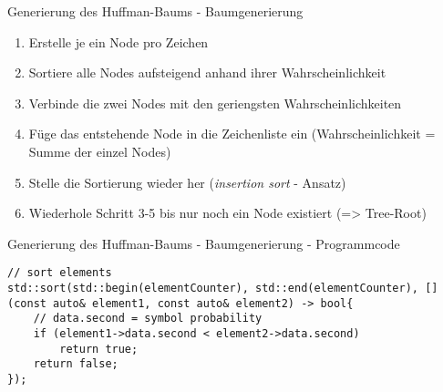 \documentclass{beamer}
\begin{document}
  
  \begin{frame}{Generierung des Huffman-Baums - \newline Baumgenerierung}
  	\begin{enumerate}
  		\item Erstelle je ein Node pro Zeichen
  		\item Sortiere alle Nodes aufsteigend anhand ihrer Wahrscheinlichkeit
  		\item Verbinde die zwei Nodes mit den geriengsten Wahrscheinlichkeiten
  		\item Füge das entstehende Node in die Zeichenliste ein \newline (Wahrscheinlichkeit = Summe der einzel Nodes)
  		\item Stelle die Sortierung wieder her \newline (\textit{insertion sort} - Ansatz)
  		\item Wiederhole Schritt 3-5 bis nur noch ein Node existiert \newline (=> Tree-Root)
  	\end{enumerate}
  \end{frame}
  
     \begin{frame}[fragile]{Generierung des Huffman-Baums - \newline Baumgenerierung - Programmcode}
     	\begin{lstlisting}[style=numbers]
// sort elements
std::sort(std::begin(elementCounter), std::end(elementCounter), [](const auto& element1, const auto& element2) -> bool{
    // data.second = symbol probability
    if (element1->data.second < element2->data.second)
        return true;
    return false;
});
\end{lstlisting}
\end{frame}
  
\end{document}
